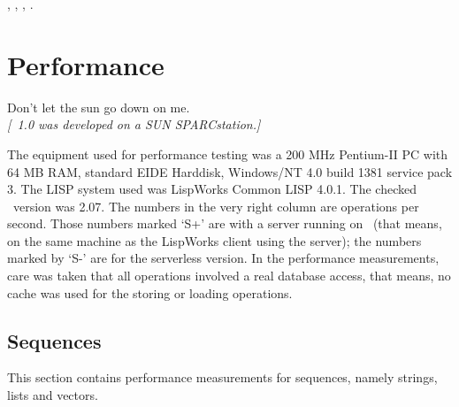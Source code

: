  {}, , ,
.

\section{Performance}%
\label{sec:Performance}%
%
\begin{fortune}[7cm]%
Don't let the sun go down on me.
\\[\medskipamount]
\emph{[\plob\ 1.0 was developed on a SUN SPARCstation.]}
\end{fortune}%

\newlength{\codew}\setlength{\codew}{0.3\textwidth}%
\newlength{\perfw}\setlength{\perfw}{0.35\textwidth}%
\newlength{\timew}\setlength{\timew}{8\lispblank}%
%
\newlength\codeblank%
\settowidth\codeblank{\texttt{\CompactCodeSize\ }}%
\def\timeboxi#1{\parbox[t]{\timew}{%
\hspace*{\fill}#1}\smallskip}%
\def\timeboxii#1#2{\parbox[t]{\timew}{%
S+\hspace*{\fill}#1\\%
S-\hspace*{\fill}#2}\smallskip}%
\noindent{}The equipment used for performance testing was a 200 MHz
Pentium-II PC with 64 MB RAM, standard EIDE Harddisk, Windows/NT 4.0
build 1381 service pack 3. The LISP system used was LispWorks Common
LISP 4.0.1.  The checked \plob\ version was 2.07. The numbers in the
very right column are operations per second. Those numbers marked `S+'
are with a server running on \ (that means, on the
same machine as the LispWorks client using the server); the numbers
marked by `S-' are for the serverless version.  In the performance
measurements, care was taken that all operations involved a real
database access, that means, no cache was used for the storing or
loading operations.

\subsection{Sequences}

This section contains performance measurements for sequences, namely
strings, lists and vectors.

